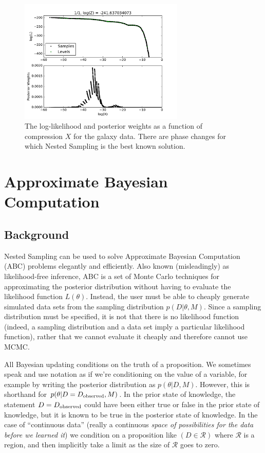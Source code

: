 \documentclass[article]{jss}
\begin{document}
\begin{figure}[ht!]
\centering
\includegraphics[width=0.7\textwidth]{figures/galaxies_fig3.pdf}
\caption{The log-likelihood and posterior weights as a function
of compression $X$ for the galaxy data. There are phase changes
\citep{skilling} for which Nested Sampling is the best known
solution.
\label{fig:galaxies_fig3}}
\end{figure}


\section{Approximate Bayesian Computation}
\subsection{Background}
Nested Sampling can be used to solve Approximate Bayesian Computation (ABC)
problems elegantly and efficiently.
Also known (misleadingly) as likelihood-free inference,
ABC
is a set of Monte Carlo techniques for approximating the posterior distribution
without having to evaluate the likelihood function $L(\theta)$. Instead, 
the user must be able to cheaply
generate simulated data sets from the sampling distribution $p(D|\theta, M)$.
Since a sampling distribution must be specified, it is not that there is
no likelihood function (indeed, a sampling distribution and
a data set imply a particular likelihood function), rather that we cannot
evaluate it cheaply and therefore cannot use MCMC.

All Bayesian updating conditions on the truth of a proposition. We sometimes
speak and use notation as if we're conditioning on the value of a variable, for
example by writing the posterior distribution as
$p(\theta | D, M)$. However,
this is shorthand for $p(\theta | D = D_{\rm observed}, M)$.
In the prior state of knowledge, the statement
$D = D_{\rm observed}$ could have been either
true or false in the prior state of knowledge, but it is known to be true
in the posterior state of knowledge.
In the case of ``continuous data'' (really a continuous {\it space of
possibilities for the data before we learned it}) we condition on a
proposition like $(D \in \mathcal{R})$ where $\mathcal{R}$ is a region, and
then implicitly take a limit as the size of $\mathcal{R}$ goes to zero.
\end{document}
